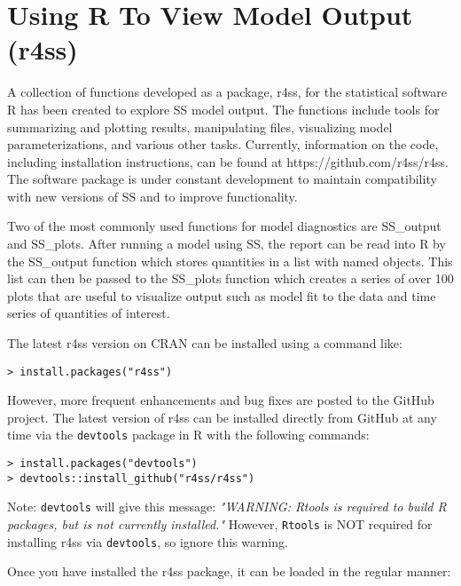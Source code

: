 \section{Using R To View Model Output (r4ss)}\label{r4ss}

A collection of functions developed as a package, r4ss, for the statistical software R has been created to explore SS model output.  The functions include tools for summarizing and plotting results, manipulating files, visualizing model parameterizations, and various other tasks.  Currently, information on the code, including installation instructions, can be found at https://github.com/r4ss/r4ss.  The software package is under constant development to maintain compatibility with new versions of SS and to improve functionality. 

Two of the most commonly used functions for model diagnostics are SS\_output and SS\_plots.  After running a model using SS, the report can be read into R by the SS\_output function which stores quantities in a list with named objects.  This list can then be passed to the SS\_plots function which creates a series of over 100 plots that are useful to visualize output such as model fit to the data and time series of quantities of interest. 

The latest r4ss version on CRAN can be installed using a command like:

\begin{verbatim}
> install.packages("r4ss")
\end{verbatim}

However, more frequent enhancements and bug fixes are posted to the GitHub project.  The latest version of r4ss can be installed directly from GitHub at any time via the \texttt{devtools} package in R with the following commands:

\begin{verbatim}
> install.packages("devtools")
> devtools::install_github("r4ss/r4ss")
\end{verbatim}

Note: \texttt{devtools} will give this message: \textit{"WARNING: Rtools is required to build R packages, but is not currently installed."} However, \texttt{Rtools} is NOT required for installing r4ss via \texttt{devtools}, so ignore this warning.  

Once you have installed the r4ss package, it can be loaded in the regular manner:

